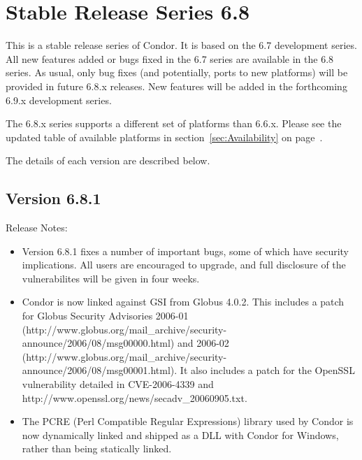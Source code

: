 \section{\label{sec:History-6-8}Stable Release Series 6.8}

This is a stable release series of Condor.
It is based on the 6.7 development series.
All new features added or bugs fixed in the 6.7 series are available
in the 6.8 series.
As usual, only bug fixes (and potentially, ports to new platforms)
will be provided in future 6.8.x releases.
New features will be added in the forthcoming 6.9.x development series.


The 6.8.x series supports a different set of platforms than 6.6.x.
Please see the updated table of available platforms in
section~\ref{sec:Availability} on page~\pageref{sec:Availability}.

The details of each version are described below.


\subsection*{\label{sec:New-6-8-1}Version 6.8.1}

\noindent Release Notes:

\begin{itemize}

\item Version 6.8.1 fixes a number of important bugs, some of which have
security implications.  All users are encouraged to upgrade, and full
disclosure of the vulnerabilites will be given in four weeks.

\item Condor is now linked against GSI from Globus 4.0.2. This includes
a patch for Globus Security Advisories 2006-01 
(http://www.globus.org/mail\_archive/security-announce/2006/08/msg00000.html)
and 2006-02 
(http://www.globus.org/mail\_archive/security-announce/2006/08/msg00001.html).
It also includes a
patch for the OpenSSL vulnerability detailed in CVE-2006-4339 and
http://www.openssl.org/news/secadv\_20060905.txt.

\item The PCRE (Perl Compatible Regular Expressions) library used by
Condor is now dynamically linked and shipped as a DLL with Condor for
Windows, rather than being statically linked.

\end{itemize}


